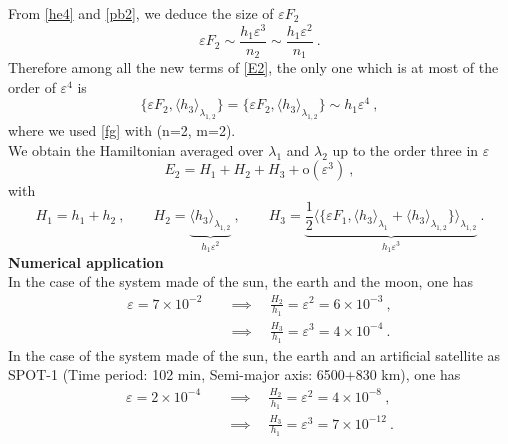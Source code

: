 \documentclass[a4paper]{article}
\begin{document}
From \eqref{he4} and \eqref{pb2}, we deduce the size of $\varepsilon F_{2}$
\begin{equation}
\varepsilon F_{2} \sim \frac{h_{1}\varepsilon^{3}}{n_{2}} \sim \frac{h_{1}\varepsilon^{2}}{n_{1}} \ .
\end{equation}
Therefore among all the new terms of \eqref{E2}, the only one which is at most of the order of $\varepsilon^{4}$ is
\begin{equation}
\{\varepsilon F_{2}, \langle h_{3} \rangle _{\lambda_{1,2}}\}=\{\varepsilon F_{2}, \langle h_{3} \rangle _{\lambda_{1,2}}\} \sim h_{1}\varepsilon^{4} \ ,
\end{equation}
where we used \eqref{fg} with (n=2, m=2). \\
We obtain the Hamiltonian averaged over $\lambda_{1}$ and $\lambda_{2}$ up to the order three in $\varepsilon$
\begin{equation}
E_{2}=H_{1}+H_{2}+H_{3}+\text{o}(\varepsilon^{3}) \ ,
\label{hquadrupolar}
\end{equation}
with
\begin{equation}
H_{1}=h_{1}+h_{2} \ , \qquad H_{2}=\underbrace{ \langle h_{3} \rangle _{\lambda_{1,2}}}_{h_{1}\varepsilon^{2}} \ , \qquad H_{3}=\underbrace{\frac{1}{2} \langle {\{\varepsilon F_{1}, \langle h_{3} \rangle _{\lambda_{1}} +  \langle h_{3} \rangle _{\lambda_{1,2}}\}} \rangle _{\lambda_{1,2}}}_{h_{1}\varepsilon^{3}} \ .
\end{equation}
\textbf{Numerical application} \\
In the case of the system made of the sun, the earth and the moon, one has 
\begin{align}
\varepsilon=7 \times 10^{-2} \quad &\implies \quad \frac{H_{2}}{h_{1}}=\varepsilon^{2}=6 \times 10^{-3} \ , \\
 &\implies \quad \frac{H_{3}}{h_{1}}=\varepsilon^{3}=4 \times 10^{-4} \ .
\end{align}
In the case of the system made of the sun, the earth and an artificial satellite as SPOT-1 (Time period: 102 min, Semi-major axis: 6500+830 km), one has 
\begin{align}
\varepsilon=2 \times 10^{-4} \quad &\implies \quad \frac{H_{2}}{h_{1}}=\varepsilon^{2}=4 \times 10^{-8} \ , \\
 &\implies \quad \frac{H_{3}}{h_{1}}=\varepsilon^{3}=7 \times 10^{-12} \ . 
\end{align}
\end{document}
